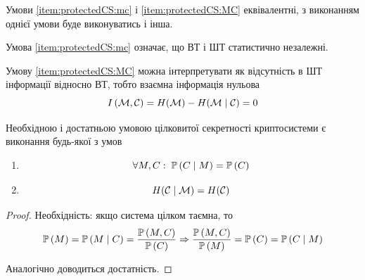 \begin{remark}
    Умови \ref{item:protectedCS:mc} і \ref{item:protectedCS:MC} еквівалентні, з
    виконанням однієї умови буде виконуватись і інша.

    Умова \ref{item:protectedCS:mc} означає, що ВТ і ШТ статистично незалежні.

    Умову \ref{item:protectedCS:MC} можна інтерпретувати як відсутність в ШТ
    інформації відносно ВТ, тобто взаємна інформація нульова
    $$I\left( \mathcal{M}, \mathcal{C} \right) = H\!\left( \mathcal{M} \right)
        - H\!\left( \mathcal{M} \;\middle|\; \mathcal{C} \right) = 0$$
\end{remark}

\begin{theorem}\label{theorem:protectedCS}
    Необхідною і достатньою умовою цілковитої секретності криптосистеми є
    виконання будь-якої з умов
    \begin{enumerate}
        \item
            $$\forall M, C:\; \mathbb{P}\left( C \;\middle|\; M \right) = \mathbb{P}\left( C \right)$$
        \item
            $$H\!\left( \mathcal{C} \;\middle|\; \mathcal{M} \right)
                = H\!\left( \mathcal{C} \right)$$
    \end{enumerate}
\end{theorem}

\begin{proof}
    Необхідність: якщо система цілком таємна, то 
    $$\mathbb{P}\left( M \right)
        = \mathbb{P}\left( M \;\middle|\; C \right)
        =\frac{\mathbb{P}\left( M,C \right)}{\mathbb{P}\left( C \right)}
            \Rightarrow
        \frac{\mathbb{P}\left( M,C \right)}{\mathbb{P}\left( M \right)}
            =\mathbb{P}\left( C \right)
            =\mathbb{P}\left( C \;\middle|\; M \right)$$

    Аналогічно доводиться достатність.
\end{proof}

